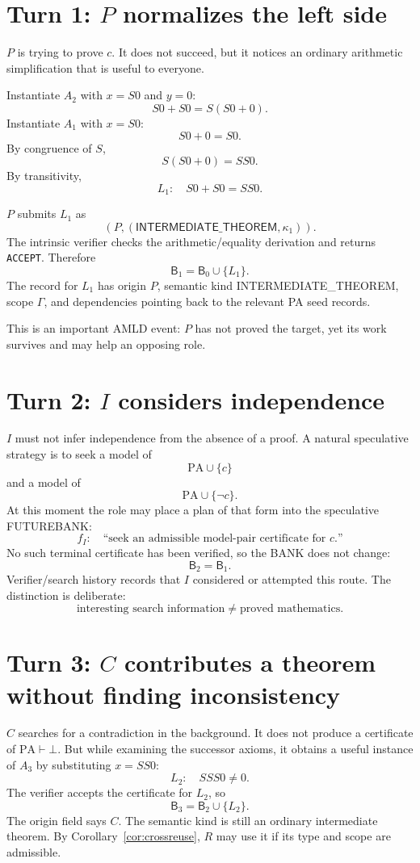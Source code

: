 \documentclass[11pt,openany]{book}
\theoremstyle{definition}
\theoremstyle{remark}
\newcommand{\Bank}{\mathsf{B}}
\begin{document}
\section{Turn 1: \texorpdfstring{$P$}{P} normalizes the left side}
$P$ is trying to prove $c$. It does not succeed, but it notices an ordinary arithmetic simplification that is useful to everyone.

Instantiate $A_2$ with $x=S0$ and $y=0$:
\[
S0+S0=S(S0+0).
\]
Instantiate $A_1$ with $x=S0$:
\[
S0+0=S0.
\]
By congruence of $S$,
\[
S(S0+0)=SS0.
\]
By transitivity,
\[
L_1:\quad S0+S0=SS0.
\]

$P$ submits $L_1$ as
\[
(P,(\mathsf{INTERMEDIATE\_THEOREM},\kappa_1)).
\]
The intrinsic verifier checks the arithmetic/equality derivation and returns \texttt{ACCEPT}. Therefore
\[
\Bank_1=\Bank_0\cup\{L_1\}.
\]
The record for $L_1$ has origin $P$, semantic kind \textsf{INTERMEDIATE\_THEOREM}, scope $\Gamma$, and dependencies pointing back to the relevant PA seed records.

This is an important AMLD event: $P$ has not proved the target, yet its work survives and may help an opposing role.

\section{Turn 2: \texorpdfstring{$I$}{I} considers independence}
$I$ must not infer independence from the absence of a proof. A natural speculative strategy is to seek a model of
\[
\mathrm{PA}\cup\{c\}
\]
and a model of
\[
\mathrm{PA}\cup\{\neg c\}.
\]
At this moment the role may place a plan of that form into the speculative FUTUREBANK:
\[
f_I:\quad \text{``seek an admissible model-pair certificate for }c\text{.''}
\]
No such terminal certificate has been verified, so the BANK does not change:
\[
\Bank_2=\Bank_1.
\]
Verifier/search history records that $I$ considered or attempted this route. The distinction is deliberate:
\[
\text{interesting search information}\neq\text{proved mathematics}.
\]

\section{Turn 3: \texorpdfstring{$C$}{C} contributes a theorem without finding inconsistency}
$C$ searches for a contradiction in the background. It does not produce a certificate of $\mathrm{PA}\vdash\bot$. But while examining the successor axioms, it obtains a useful instance of $A_3$ by substituting $x=SS0$:
\[
L_2:\quad SSS0\neq0.
\]
The verifier accepts the certificate for $L_2$, so
\[
\Bank_3=\Bank_2\cup\{L_2\}.
\]
The origin field says $C$. The semantic kind is still an ordinary intermediate theorem. By Corollary~\ref{cor:crossreuse}, $R$ may use it if its type and scope are admissible.
\end{document}
